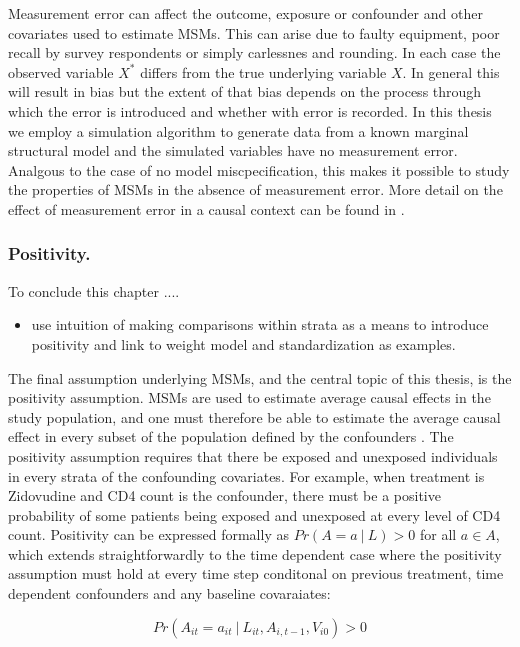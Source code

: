 \documentclass[11pt]{article}
\providecommand{\tightlist}{%
      \setlength{\itemsep}{0pt}\setlength{\parskip}{0pt}}
\begin{document}
Measurement error can affect the outcome, exposure or confounder and
other covariates used to estimate MSMs. This can arise due to faulty
equipment, poor recall by survey respondents or simply carlessnes and
rounding. In each case the observed variable \(X^*\) differs from the
true underlying variable \(X\). In general this will result in bias but
the extent of that bias depends on the process through which the error
is introduced and whether with error is recorded. In this thesis we
employ a simulation algorithm to generate data from a known marginal
structural model and the simulated variables have no measurement error.
Analgous to the case of no model miscpecification, this makes it
possible to study the properties of MSMs in the absence of measurement
error. More detail on the effect of measurement error in a causal
context can be found in \citet{Hernan2009}.

\subsubsection{Positivity.}\label{positivity.}

To conclude this chapter ....

\begin{itemize}
\tightlist
\item
  use intuition of making comparisons within strata as a means to
  introduce positivity and link to weight model and standardization as
  examples.
\end{itemize}

The final assumption underlying MSMs, and the central topic of this
thesis, is the positivity assumption. MSMs are used to estimate average
causal effects in the study population, and one must therefore be able
to estimate the average causal effect in every subset of the population
defined by the confounders \citet{Cole2008}. The positivity assumption
requires that there be exposed and unexposed individuals in every strata
of the confounding covariates. For example, when treatment is Zidovudine
and CD4 count is the confounder, there must be a positive probability of
some patients being exposed and unexposed at every level of CD4 count.
Positivity can be expressed formally as \(Pr(A=a\ |\ L) > 0\) for all
\(a \in A\), which extends straightforwardly to the time dependent case
where the positivity assumption must hold at every time step conditonal
on previous treatment, time dependent confounders and any baseline
covaraiates:

\[Pr(A_{it}=a_{it}\ |\ L_{it}, A_{i, t-1}, V_{i0}) > 0\]
\end{document}
